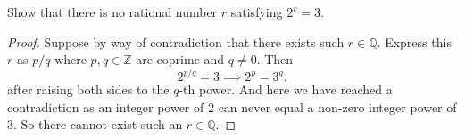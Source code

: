 \documentclass[12pt, letterpaper]{article}
\newcommand{\Z}{\mathbb{Z}}
\newcommand{\Q}{\mathbb{Q}}
\begin{document}
\begin{tcolorbox}[title=Exercise 1.2.2.]
  Show that there is no rational number $r$ satisfying $2^r = 3$.
\end{tcolorbox}
\begin{proof}
  Suppose by way of contradiction that there exists such $r \in \Q$.
  Express this $r$ as $p/q$ where $p, q \in \Z$ are coprime and $q \ne 0$.
  Then
  \[2^{p/q} = 3 \implies 2^p = 3^q.\]
  after raising both sides to the $q$-th power. And here we have reached
  a contradiction as an integer power of $2$ can never equal a non-zero
  integer power of $3$. So there cannot exist such an $r \in \Q$.
\end{proof}
\end{document}
